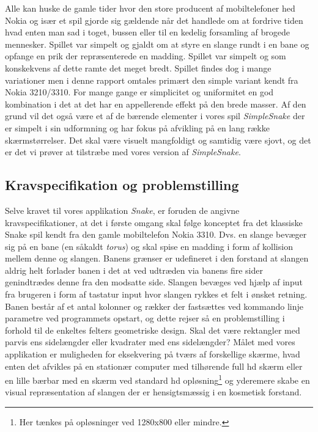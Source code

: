 \documentclass[]{article}
\begin{document}
Alle kan huske de gamle tider hvor den store producent af mobiltelefoner hed Nokia og især et spil gjorde sig gældende når det handlede om at fordrive tiden hvad enten man sad i toget, bussen eller til en kedelig forsamling af brogede mennesker. Spillet var simpelt og gjaldt om at styre en slange rundt i en bane og opfange en prik der repræsenterede en madding. Spillet var simpelt og som konskekvens af dette ramte det meget bredt. Spillet findes dog i mange variationer men i denne rapport omtales primært den simple variant kendt fra Nokia 3210/3310. For mange gange er simplicitet og uniformitet en god kombination i det at det har en appellerende effekt på den brede masser. Af den grund vil det også være et af de bærende elementer i vores spil \textit{SimpleSnake} der er simpelt i sin udformning og har fokus på afvikling på en lang række skærmstørrelser. Det skal være visuelt mangfoldigt og samtidig være sjovt, og det er det vi prøver at tilstræbe med vores version af \textit{SimpleSnake}. 

\subsection{Kravspecifikation og problemstilling}

Selve kravet til  vores applikation \textit{Snake}, er foruden de angivne kravspecifikationer, at det i første omgang skal følge konceptet fra det klassiske Snake spil kendt fra den gamle mobiltelefon Nokia 3310. Dvs. en slange bevæger sig på en bane (en såkaldt \textit{torus}) og skal spise en madding i form af kollision mellem denne og slangen. Banens grænser er udefineret i den forstand at slangen aldrig helt forlader banen i det at ved udtræden via banens fire sider genindtrædes denne fra den modsatte side. Slangen bevæges ved hjælp af input fra brugeren i form af tastatur input hvor slangen rykkes et felt i ønsket retning. Banen består af et antal kolonner og rækker der fastsættes ved kommando linje parametre ved programmets opstart, og dette rejser så en problemstilling i forhold til de enkeltes felters geometriske design. Skal det være rektangler med parvis ens sidelængder eller kvadrater med ens sidelængder? Målet med vores applikation er muligheden for eksekvering på tværs af forskellige skærme, hvad enten det afvikles på en stationær computer med tilhørende full hd skærm eller en lille bærbar med en skærm ved standard hd opløsning\footnote{Her tænkes på opløsninger ved 1280x800 eller mindre.} og yderemere skabe en visual repræsentation af slangen der er hensigtsmæssig i en kosmetisk forstand. 
\end{document}
